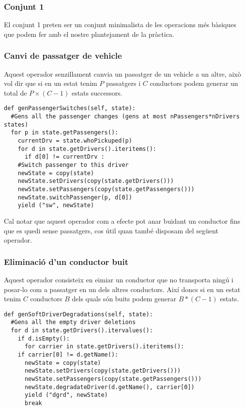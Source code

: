 \subsubsection{Conjunt 1}
El conjunt 1 preten ser un conjunt minimalista de les operacions més bàsiques que podem fer amb el nostre plantejament
de la pràctica.
\subsubsection{Canvi de passatger de vehicle}
Aquest operador senzillament canvia un passatger de un vehicle a un altre, això vol dir que si en un estat
tenim $P$ passatgers i $C$ conductors podem generar un total de $P\times(C-1)$ estats successors.

\begin{verbatim}
def genPassengerSwitches(self, state):
  #Gens all the passenger changes (gens at most nPassengers*nDrivers states)
  for p in state.getPassengers():
    currentDrv = state.whoPickuped(p)  
    for d in state.getDrivers().iteritems():
      if d[0] != currentDrv :
	#Switch passenger to this driver
	newState = copy(state)
	newState.setDrivers(copy(state.getDrivers()))
	newState.setPassengers(copy(state.getPassengers()))
	newState.switchPassenger(p, d[0])
	yield ("sw", newState)
\end{verbatim}

Cal notar que aquest operador com a efecte pot anar buidant un conductor fins que es quedi sense passatgers,
cos útil quan també disposam del següent operador.

\subsubsection{Eliminació d'un conductor buit}
Aquest operador consisteix en e\lgem imiar un conductor que no transporta ningú i posar-lo com a passatger
en un dels altres conductors. Així doncs si en un estat tenim $C$ conductors $B$ dels quals són buits
podem generar $B*(C-1)$ estats.

\begin{verbatim}
def genSoftDriverDegradations(self, state):
  #Gens all the empty driver deletions
  for d in state.getDrivers().itervalues():
    if d.isEmpty():
      for carrier in state.getDrivers().iteritems():
	if carrier[0] != d.getName():
	  newState = copy(state)
	  newState.setDrivers(copy(state.getDrivers()))
	  newState.setPassengers(copy(state.getPassengers()))
	  newState.degradateDriver(d.getName(), carrier[0])
	  yield ("dgrd", newState)
	  break
\end{verbatim}

